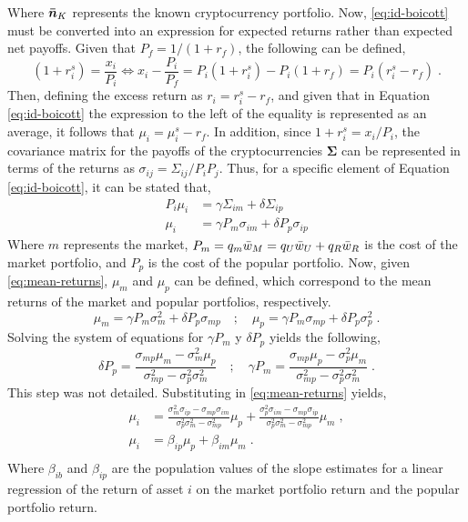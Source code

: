 Where $\bm{\Bar{n}}_K$ represents the known cryptocurrency portfolio. Now, \eqref{eq:id-boicott} must be converted into an expression for expected returns rather than expected net payoffs. Given that $P_f=1/(1+r_f)$, the following can be defined,
\begin{equation*}
	(1+r^{s}_{i}) = \frac{x_i}{P_i} \Leftrightarrow x_i - \frac{P_i}{P_f}=P_i(1+r^{s}_{i}) - P_i(1+r_f)=P_i(r^{s}_{i}-r_f)\;.
\end{equation*}
Then, defining the excess return as $r_i = r^{s}_{i} - r_{f}$, and given that in Equation \eqref{eq:id-boicott} the expression to the left of the equality is represented as an average, it follows that $\mu_{i} = \mu^{s}_{i} - r_{f}$. In addition, since $1 + r^{s}_{i} = x_i / P_i$, the covariance matrix for the payoffs of the cryptocurrencies $\bm{\Sigma}$ can be represented in terms of the returns as $\sigma_{ij} = \Sigma_{ij} / P_{i} P_{j}$. Thus, for a specific element of Equation \eqref{eq:id-boicott}, it can be stated that,
\begin{equation}
	\begin{split}
		P_i \mu_i&=\gamma \Sigma_{im} + \delta\Sigma_{ip}\\
		\mu_{i} &= \gamma P_m \sigma_{im} + \delta P_p \sigma_{ip}
	\end{split}
	\label{eq:mean-returns}
\end{equation}
Where $m$ represents the market, $P_m = q_m \Bar{w}_{M} = q_U \Bar{w}_{U} + q_R \Bar{w}_{R}$ is the cost of the market portfolio, and $P_p$ is the cost of the popular portfolio. Now, given \eqref{eq:mean-returns}, $\mu_{m}$ and $\mu_{p}$ can be defined, which correspond to the mean returns of the market and popular portfolios, respectively.
\begin{equation*}
	\mu_{m} = \gamma P_m \sigma^{2}_{m} + \delta P_p \sigma_{mp} \quad; \quad \mu_{p} = \gamma P_m \sigma_{mp} + \delta P_p \sigma^{2}_{p}\;.
\end{equation*}
Solving the system of equations for $\gamma P_m$ y $\delta P_p$ yields the following,
\begin{equation*}
	\delta P_p = \frac{\sigma_{mp}\mu_{m}-\sigma^{2}_{m}\mu_{p}}{\sigma^{2}_{mp}-\sigma^{2}_{p}\sigma^{2}_{m}}\quad ; \quad \gamma P_m = \frac{\sigma_{mp}\mu_{p}-\sigma^{2}_{p}\mu_{m}}{\sigma^{2}_{mp}-\sigma^{2}_{p}\sigma^{2}_{m}}\;.
\end{equation*}
This step was not detailed. Substituting in \eqref{eq:mean-returns} yields,
\begin{equation}
	\begin{split}
		\mu_{i} &= \frac{\sigma^{2}_{m}\sigma_{ip}-\sigma_{mp}\sigma_{im}}{\sigma^{2}_{p}\sigma^{2}_{m}-\sigma^{2}_{mp}}\mu_{p} + \frac{\sigma^{2}_{p}\sigma_{im}-\sigma_{mp}\sigma_{ip}}{\sigma^{2}_{p}\sigma^{2}_{m}-\sigma^{2}_{mp}}\mu_{m}\;,\\
		\mu_{i}&= \beta_{ip}\mu_{p} + \beta_{im}\mu_{m}\;.\\  
	\end{split}
\end{equation}
Where $\beta_{ib}$ and $\beta_{ip}$ are the population values of the slope estimates for a linear regression of the return of asset $i$ on the market portfolio return and the popular portfolio return.

